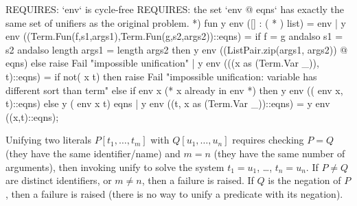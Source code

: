 REQUIRES: `env` is cycle-free
REQUIRES: the set `env @ eqns` has exactly the same set of
          unifiers as the original problem. *)
fun y env ([] : ( * ) list) = env
  | y env ((Term.Fun(f,s1,args1),Term.Fun(g,s2,args2))::eqns) = 
      if f = g andalso s1 = s2 andalso length args1 = length args2
      then y env ((ListPair.zip(args1, args2)) @ eqns)
      else raise Fail "impossible unification"
  | y env (((x as (Term.Var _)), t)::eqns) =
      if not( x t)
      then raise Fail "impossible unification: variable has different sort than term"
      else if  env x (* x already in env *)
      then y env (( env x, t)::eqns)
      else y ( env x t) eqns
  | y env ((t, x as (Term.Var _))::eqns) = y env ((x,t)::eqns);
\eatline
{}\nwendcode{}\nwdocspar
\begin{node}
Unifying two literals $P[t_{1},\dots,t_{m}]$ with $Q[u_{1},\dots,u_{n}]$
requires checking $P=Q$ (they have the same identifier/name) and $m=n$ (they have the same number of arguments), then invoking
{\Tt{}unify\nwendquote} to solve the system $t_{1}=u_{1}$, \dots, $t_{n}=u_{n}$.
If $P\neq Q$ are distinct identifiers, or $m\neq n$, then a failure is raised.
If $Q$ is the negation of $P$, then a failure is raised (there is no
way to unify a predicate with its negation).
\end{node}

